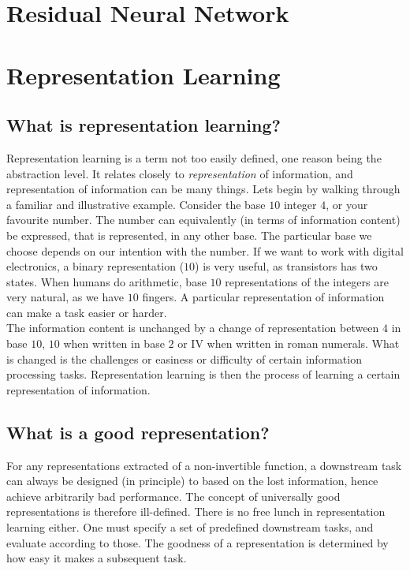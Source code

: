 \documentclass[../../thesis.tex]{subfiles}
\begin{document}
\section{Residual Neural Network}


\section{Representation Learning}


\subsection{What is representation learning?}
Representation learning is a term not too easily defined, one reason being the abstraction level. It relates closely to \textit{representation} of information, and representation of information can be many things. Lets begin by walking through a familiar and illustrative example. Consider the base $10$ integer $4$, or your favourite number. The number can equivalently (in terms of information content) be expressed, that is represented, in any other base. The particular base we choose depends on our intention with the number. If we want to work with digital electronics, a binary representation ($10$) is very useful, as transistors has two states. When humans do arithmetic, base $10$ representations of the integers are very natural, as we have $10$ fingers. A particular representation of information can make a task easier or harder.
\\ The information content is unchanged by a change of representation between $4$ in base $10$, $10$ when written in base $2$ or \RN{4} when written in roman numerals. What is changed is the challenges or easiness or difficulty of certain information processing tasks. Representation learning is then the process of learning a certain representation of information. 

\subsection{What is a good representation?}

For any representations extracted of a non-invertible function, a downstream task can always be designed (in principle) to based on the lost information, hence achieve arbitrarily bad performance. The concept of universally good representations is therefore ill-defined. There is no free lunch in representation learning either. One must specify a set of predefined downstream tasks, and evaluate according to those. The goodness of a representation is determined by how easy it makes a subsequent task.
\end{document}

